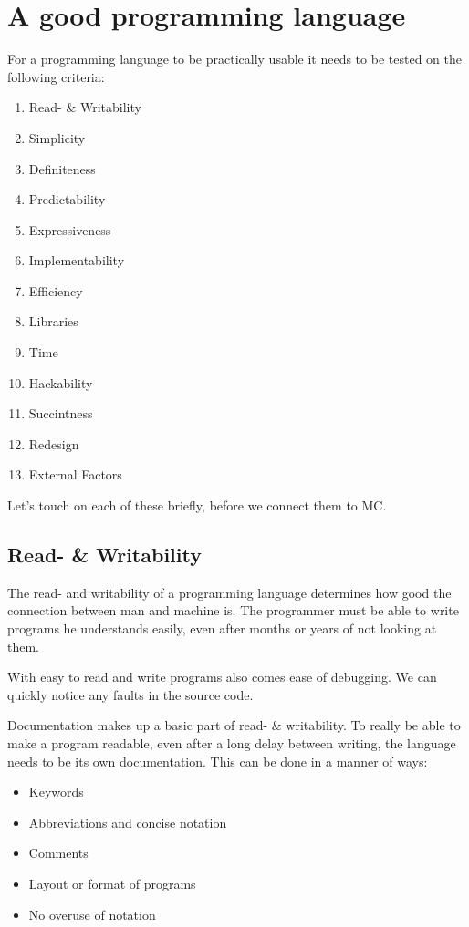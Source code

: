 \chapter{A good programming language}\label{sec:criteria}

For a programming language to be practically usable it needs to be tested on the following criteria\cite{khedker1997makes,graham2004hackers}:

\begin{multicols}{2}
\begin{enumerate}[noitemsep]
   \item Read- \& Writability
   \item Simplicity
   \item Definiteness
   \item Predictability
   \item Expressiveness
   \item Implementability
   \item Efficiency
   \item Libraries
   \item Time
   \item Hackability
   \item Succintness
   \item Redesign
   \item External Factors
\end{enumerate}
\end{multicols}
Let's touch on each of these briefly, before we connect them to MC.

\section{Read- \& Writability }
The read- and writability of a programming language determines how good the connection between man and machine is.
The programmer must be able to write programs he understands easily, even after months or years of not looking at them.

With easy to read and write programs also comes ease of debugging.
We can quickly notice any faults in the source code.

Documentation makes up a basic part of read- \& writability.
To really be able to make a program readable, even after a long delay between writing, the language needs to be its own documentation.
This can be done in a manner of ways:
\begin{itemize}[noitemsep]
   \item Keywords
   \item Abbreviations and concise notation
   \item Comments
   \item Layout or format of programs
   \item No overuse of notation
\end{itemize}

